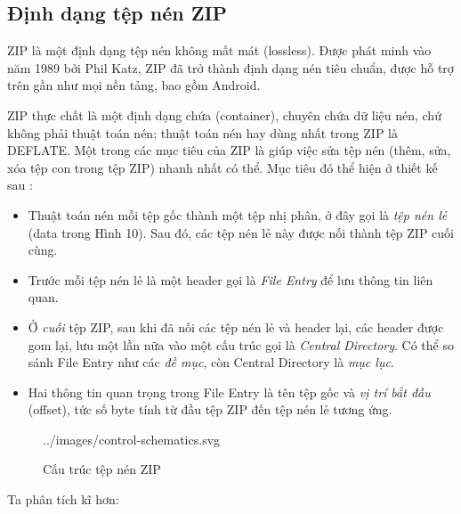 \documentclass[../../thesis]{subfiles}
\begin{document}
\subsection{Định dạng tệp nén ZIP}

ZIP là một định dạng tệp nén không mất mát (lossless). Được phát minh vào năm
1989 bởi Phil Katz, ZIP đã trở thành định dạng nén tiêu chuẩn, được hỗ trợ trên
gần như mọi nền tảng, bao gồm Android.

ZIP thực chất là một định dạng chứa (container), chuyên chứa dữ liệu nén, chứ
không phải thuật toán nén; thuật toán nén hay dùng nhất trong ZIP là DEFLATE.
Một trong các mục tiêu của ZIP là giúp việc sửa tệp nén (thêm, sửa, xóa tệp con
trong tệp ZIP) nhanh nhất có thể. Mục tiêu đó thể hiện ở thiết kế sau
\cite{PKWARE_APPNOTE}:

\begin{itemize}
    \item
        Thuật toán nén mỗi tệp gốc thành một tệp nhị phân, ở đây gọi là
        \emph{tệp nén lẻ} (data trong Hình 10). Sau đó, các tệp nén lẻ này được
        nối thành tệp ZIP cuối cùng.
    \item
        Trước mỗi tệp nén lẻ là một header gọi là \emph{File Entry} để lưu thông
        tin liên quan.
    \item
        Ở \emph{cuối} tệp ZIP, sau khi đã nối các tệp nén lẻ và header lại, các
        header được gom lại, lưu một lần nữa vào một cấu trúc gọi là
        \emph{Central Directory}. Có thể so sánh File Entry như các \emph{đề
        mục}, còn Central Directory là \emph{mục lục}.
    \item
        Hai thông tin quan trọng trong File Entry là tên tệp gốc và \emph{vị trí
        bắt đầu} (offset), tức số byte tính từ đầu tệp ZIP đến tệp nén lẻ tương
        ứng.
\end{itemize}

\begin{figure}[H]
    \centering
    
        {../images/control-schematics.svg}
    \caption{Cấu trúc tệp nén ZIP \cite{WIKI_ZIP}}
    \label{fig:zip_layout}
\end{figure}

Ta phân tích kĩ hơn:
\end{document}
